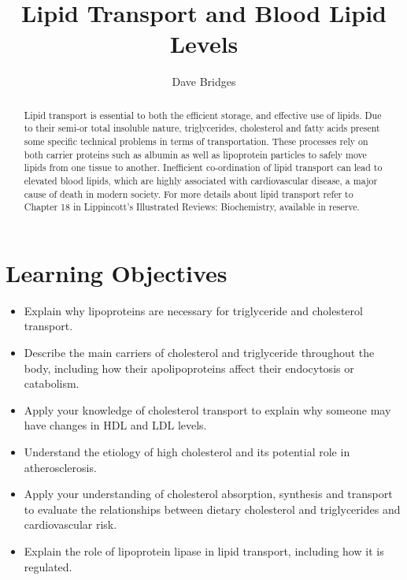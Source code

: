 \documentclass{tufte-handout}
\title{Lipid Transport and Blood Lipid Levels}
\author{Dave Bridges}
\begin{document}
\maketitle%

\begin{abstract}
\noindent  Lipid transport is essential to both the efficient storage, and effective use of lipids.  Due to their semi-or total insoluble nature, triglycerides, cholesterol and fatty acids present some specific technical problems in terms of transportation.  These processes rely on both carrier proteins such as albumin as well as lipoprotein particles to safely move lipids from one tissue to another.  Inefficient co-ordination of lipid transport can lead to elevated blood lipids, which are highly associated with cardiovascular disease, a major cause of death in modern society.  For more details about lipid transport refer to Chapter 18 in Lippincott's Illustrated Reviews: Biochemistry, available in reserve\cite{Ferrier2017}.
\end{abstract}

\tableofcontents

\pagebreak
\section{Learning Objectives}

\begin{itemize}
\item Explain why lipoproteins are necessary for triglyceride and cholesterol transport.
\item Describe the main carriers of cholesterol and triglyceride throughout the body, including how their apolipoproteins affect their endocytosis or catabolism.
\item Apply your knowledge of cholesterol transport to explain why someone may have changes in HDL and LDL levels.
\item Understand the etiology of high cholesterol and its potential role in atherosclerosis.  
\item Apply your understanding of cholesterol absorption, synthesis and transport to evaluate the relationships between dietary cholesterol and triglycerides and cardiovascular risk.
\item Explain the role of lipoprotein lipase in lipid transport, including how it is regulated.

\end{itemize}
\end{document}
